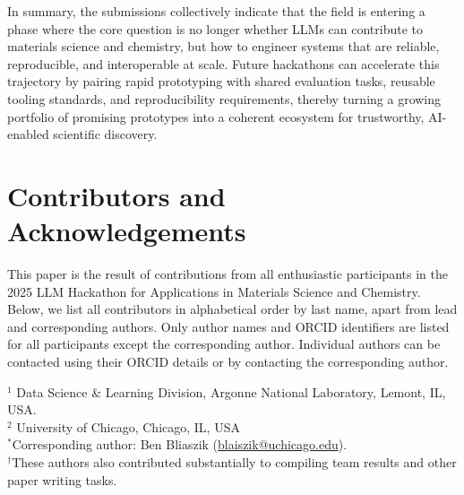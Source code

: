 \documentclass{article}
\begin{document}
In summary, the submissions collectively indicate that the field is entering a phase where the core question is
no longer whether LLMs can contribute to materials science and chemistry, but how to engineer systems that are reliable, reproducible, and interoperable at scale. Future hackathons can accelerate this
trajectory by pairing rapid prototyping with shared evaluation tasks, reusable tooling standards, and
reproducibility requirements, thereby turning a growing portfolio of promising prototypes into a coherent
ecosystem for trustworthy, AI-enabled scientific discovery.

\section*{Contributors and Acknowledgements}
This paper is the result of contributions from all enthusiastic participants in the 2025 LLM Hackathon for Applications in Materials Science and Chemistry. Below, we list all contributors in alphabetical order by last name, apart from lead and corresponding authors. Only author names and ORCID identifiers are listed for all participants except the corresponding author. Individual authors can be contacted using their ORCID details or by contacting the corresponding author.
\vspace{5pt}



\begin{center}
\small
$^1$ Data Science \& Learning Division, Argonne National Laboratory, Lemont, IL, USA.\\
$^2$ University of Chicago, Chicago, IL, USA\\
\vspace{5pt}
$^*$Corresponding author: Ben Bliaszik (\href{blaiszik@uchicago.edu}{blaiszik@uchicago.edu}).\\$^\dagger$These authors also contributed substantially to compiling team results and other paper writing tasks.
\end{center}




\clearpage
\tableofcontents
\newpage


% 





\FloatBarrier


\end{document}
